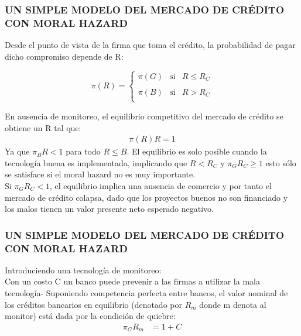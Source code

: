 \begin{frame}
    \frametitle{{\normalsize UN SIMPLE MODELO DEL MERCADO DE CRÉDITO CON MORAL HAZARD} {}}
 Desde el punto de vista de la firma que toma el crédito, la probabilidad de pagar dicho compromiso depende de R:
 
 \[\pi(R)=\left\{ \begin{array}{rcl}
 \pi(G) & \mbox{si} & R\leq R_{C}\\
 & & \\
 \pi(B) & \mbox{si} & R > R_{C}\\
 \end{array}
 \right. \] 

En ausencia de monitoreo, el equilibrio competitivo del mercado de crédito se obtiene un R tal que:
  \begin{align}
  \pi(R)R=1
  \end{align}    
Ya que $\pi_{B}R<1$ para todo $R\leq B$. El equilibrio es solo posible cuando la tecnología buena es implementada, implicando que  $R<R_{C}$ y $\pi_{G}R_{C}\geq 1$ esto sólo se satisface si el moral hazard no es muy importante.\\
Si  $\pi_{G}R_{C}<1$, el equilibrio implica una ausencia de comercio y por tanto el mercado de crédito colapsa, dado que los proyectos buenos no son financiado y los malos tienen un valor presente neto esperado negativo.

\end{frame}

\begin{frame}
\frametitle{{\normalsize UN SIMPLE MODELO DEL MERCADO DE CRÉDITO CON MORAL HAZARD} {}}
Introduciendo una tecnología de monitoreo:\\
Con un costo C un banco puede prevenir a las firmas a utilizar la mala tecnología- Suponiendo competencia perfecta entre bancos, el valor nominal de los créditos bancarios en equilibrio (denotado por $R_{m}$ donde m denota al monitor) está dada por la condición de quiebre:
\begin{align}
\pi_{G}R_{m}&=1+C
\end{align}   
\end{frame}

